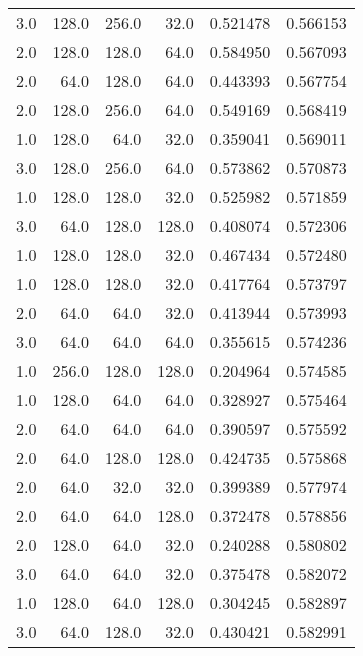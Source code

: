 \begin{longtable}{rrrrrr}
        3.0 &     128.0 &       256.0 &     32.0 &      0.521478 &    0.566153 \\
        2.0 &     128.0 &       128.0 &     64.0 &      0.584950 &    0.567093 \\
        2.0 &      64.0 &       128.0 &     64.0 &      0.443393 &    0.567754 \\
        2.0 &     128.0 &       256.0 &     64.0 &      0.549169 &    0.568419 \\
        1.0 &     128.0 &        64.0 &     32.0 &      0.359041 &    0.569011 \\
        3.0 &     128.0 &       256.0 &     64.0 &      0.573862 &    0.570873 \\
        1.0 &     128.0 &       128.0 &     32.0 &      0.525982 &    0.571859 \\
        3.0 &      64.0 &       128.0 &    128.0 &      0.408074 &    0.572306 \\
        1.0 &     128.0 &       128.0 &     32.0 &      0.467434 &    0.572480 \\
        1.0 &     128.0 &       128.0 &     32.0 &      0.417764 &    0.573797 \\
        2.0 &      64.0 &        64.0 &     32.0 &      0.413944 &    0.573993 \\
        3.0 &      64.0 &        64.0 &     64.0 &      0.355615 &    0.574236 \\
        1.0 &     256.0 &       128.0 &    128.0 &      0.204964 &    0.574585 \\
        1.0 &     128.0 &        64.0 &     64.0 &      0.328927 &    0.575464 \\
        2.0 &      64.0 &        64.0 &     64.0 &      0.390597 &    0.575592 \\
        2.0 &      64.0 &       128.0 &    128.0 &      0.424735 &    0.575868 \\
        2.0 &      64.0 &        32.0 &     32.0 &      0.399389 &    0.577974 \\
        2.0 &      64.0 &        64.0 &    128.0 &      0.372478 &    0.578856 \\
        2.0 &     128.0 &        64.0 &     32.0 &      0.240288 &    0.580802 \\
        3.0 &      64.0 &        64.0 &     32.0 &      0.375478 &    0.582072 \\
        1.0 &     128.0 &        64.0 &    128.0 &      0.304245 &    0.582897 \\
        3.0 &      64.0 &       128.0 &     32.0 &      0.430421 &    0.582991 \\

\end{longtable}
